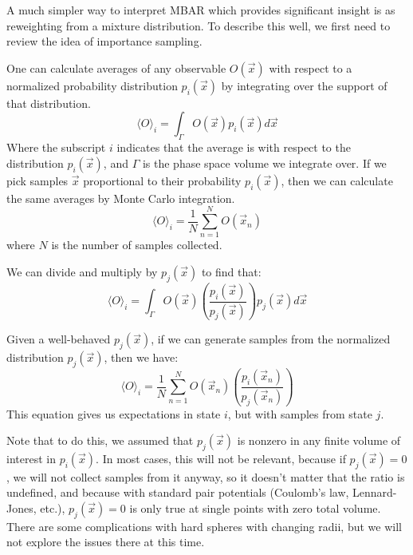 \documentclass[aps,pre,twocolumn,superscriptaddress]{revtex4-1}
\begin{document}
A much simpler way to interpret MBAR which provides significant
insight is as reweighting from a mixture distribution. To describe
this well, we first need to review the idea of importance sampling.

One can calculate averages of any observable $O(\vec{x})$ with respect
to a normalized probability distribution $p_i(\vec{x})$ by integrating over the
support of that distribution.
\[ \langle O \rangle_{i} = \int_{\Gamma} O(\vec{x}) p_i(\vec{x}) d\vec{x}\]
Where the subscript $i$ indicates that the average is with respect
to the distribution $p_i(\vec{x})$, and $\Gamma$ is the phase space volume
we integrate over. If we pick samples $\vec{x}$ proportional to their
probability $p_i(\vec{x})$, then we can calculate the same averages by
Monte Carlo integration.
\[ \langle O \rangle_{i} = \frac{1}{N}\sum_{n=1}^{N} O(\vec{x}_n) \]
where $N$ is the number of samples collected.

We can divide and multiply by $p_j(\vec{x})$ to find that:
\[ \langle O \rangle_{i} = \int_{\Gamma} O(\vec{x}) \left(\frac{p_i(\vec{x})}{p_j(\vec{x})}\right) p_j(\vec{x}) d\vec{x}\]

Given a well-behaved $p_j(\vec{x})$, if we can generate samples from
the normalized distribution $p_j(\vec{x})$, then we have:
\[ \langle O \rangle_{i} = \frac{1}{N} \sum_{n=1}^N O(\vec{x}_n) \left(\frac{p_i(\vec{x}_n)}{p_j(\vec{x}_n)}\right) \] 
This equation gives us expectations in state $i$, but with samples
from state $j$. 

Note that to do this, we assumed that $p_j(\vec{x})$ is nonzero in any
finite volume of interest in $p_i(\vec{x})$. In most cases, this will
not be relevant, because if $p_j(\vec{x})=0$, we will not collect
samples from it anyway, so it doesn't matter that the ratio is
undefined, and because with standard pair potentials (Coulomb's law,
Lennard-Jones, etc.), $p_j(\vec{x})=0$ is only true at single points
with zero total volume.  There are some complications with hard
spheres with changing radii, but we will not explore the issues there
at this time.
\end{document}
